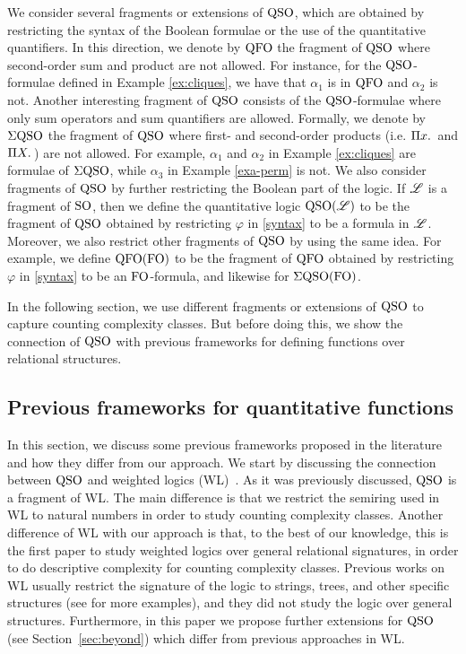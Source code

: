 We consider several fragments or extensions of ${\rm QSO}$, which are obtained by restricting the syntax of the Boolean formulae or the use of the quantitative quantifiers.
In this direction, we denote by ${\rm QFO}$ the fragment of ${\rm QSO}$ where second-order sum and product are not allowed. 
For instance, for the ${\rm QSO}$-formulae defined in Example \ref{ex:cliques}, we have that $\alpha_1$ is in ${\rm QFO}$ and $\alpha_2$ is not.
Another interesting fragment of ${\rm QSO}$ consists of the ${\rm QSO}$-formulae where only sum operators and sum quantifiers are allowed. 
Formally, we denote by $\Sigma{\rm QSO}$ the fragment of ${\rm QSO}$ where first- and second-order products (i.e. $\Pi{x}.\,$ and $\Pi{X}.\,$) are not allowed.
For example, $\alpha_1$ and $\alpha_2$ in Example \ref{ex:cliques} are formulae of $\Sigma{\rm QSO}$, while $\alpha_3$ in Example \ref{exa-perm} is not. 
We also consider fragments of ${\rm QSO}$ by further restricting the Boolean part of the logic.
If $\mathscr{L}$ is a fragment of ${\rm SO}$, then we define the quantitative logic ${\rm QSO}(\mathscr{L})$ to be the fragment of ${\rm QSO}$ obtained by restricting $\varphi$ in \eqref{syntax} to be a formula in $\mathscr{L}$. Moreover, we also restrict other fragments of ${\rm QSO}$ by using the same idea. 
For example, we define ${\rm QFO}({\rm FO})$ to be the fragment of ${\rm QFO}$ obtained by restricting $\varphi$ in \eqref{syntax} to be an ${\rm FO}$-formula, and likewise for $\Sigma{\rm QSO}({\rm FO})$.

In the following section, we use different fragments or extensions of ${\rm QSO}$ to capture counting complexity classes. But before doing this, we show the connection of ${\rm QSO}$ with previous frameworks for defining functions over relational structures.

\subsection{Previous frameworks for quantitative functions} \label{sec:previous}

In this section, we discuss some previous frameworks proposed in the literature and how they differ from our approach.
We start by discussing the connection between ${\rm QSO}$ and weighted logics (WL)~\cite{DrosteG07}. 
As it was previously discussed, ${\rm QSO}$ is a fragment of WL.
The main difference is that we restrict the semiring used in WL to natural numbers in order to study counting complexity classes.
Another difference of WL with our approach is that, to the best of our knowledge, this is the first paper to study weighted logics over general relational signatures, in order  to do descriptive complexity for counting complexity classes. 
Previous works on WL usually restrict the signature of the logic to strings, trees, and other specific structures (see \cite{droste2009handbook} for more examples), and they did not study the logic over general structures. 
Furthermore, in this paper we propose further extensions for ${\rm QSO}$ (see Section~\ref{sec:beyond}) which differ from previous approaches in WL.


